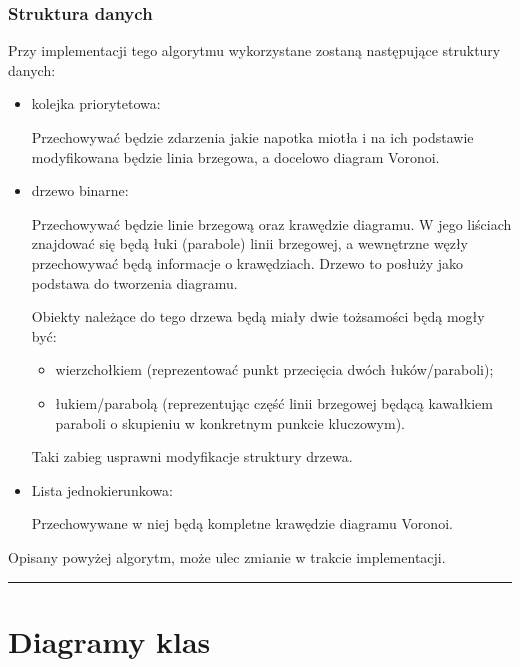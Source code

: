 \documentclass[a4paper,11pt]{article}
\newcommand{\linia}{\rule{\linewidth}{0.4mm}}
\begin{document}
\subsubsection{Struktura danych}
\noindent
Przy implementacji tego algorytmu wykorzystane zostaną następujące struktury danych:
\begin{itemize}
\item kolejka priorytetowa:

Przechowywać będzie zdarzenia jakie napotka miotła i na ich podstawie modyfikowana będzie linia brzegowa, a docelowo diagram Voronoi.
\item drzewo binarne:

Przechowywać będzie linie brzegową oraz krawędzie diagramu. W jego liściach znajdować się będą łuki (parabole) linii brzegowej, a wewnętrzne węzły przechowywać będą informacje o krawędziach. Drzewo to posłuży jako podstawa do tworzenia diagramu.

Obiekty należące do tego drzewa będą miały dwie tożsamości będą mogły być:
\begin{itemize}
\item  wierzchołkiem (reprezentować punkt przecięcia dwóch łuków/paraboli);
\item łukiem/parabolą (reprezentując część linii brzegowej będącą kawałkiem paraboli o skupieniu w konkretnym punkcie kluczowym).
\end{itemize}

Taki zabieg usprawni modyfikacje struktury drzewa.
\item Lista jednokierunkowa:

Przechowywane w niej będą kompletne krawędzie diagramu Voronoi.
\end{itemize}

Opisany powyżej algorytm, może ulec zmianie w trakcie implementacji.

\noindent\linia
\section{Diagramy klas}
\end{document}
